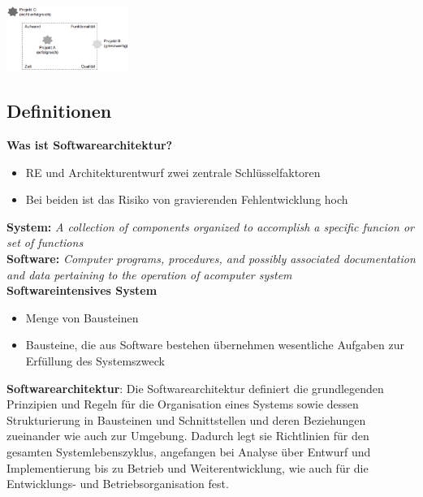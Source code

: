 \documentclass{report}
\newenvironment{Figure}
	{\par\medskip\noindent\minipage{\linewidth}}
	{\endminipage\par\medskip}
\theoremstyle{definition}
\theoremstyle{example}
\begin{document}
\begin{Figure}
   \centering
    \includegraphics[width=150px]{img/chaosReport.png}
        \label{fig:Abbildung des magischen Dreiecks zwischen Aufwand, Zeit, Funktionen, Qualitaet}
\end{Figure}


\subsection{Definitionen}
\textbf{Was ist Softwarearchitektur?}
\begin{itemize}
   \item RE und Architekturentwurf zwei zentrale Schlüsselfaktoren
   \item Bei beiden ist das Risiko von gravierenden Fehlentwicklung hoch
\end{itemize}

\textbf{System:} \textit{A collection of components organized to accomplish a specific funcion or set of functions}\\
\textbf{Software:} \textit{Computer programs, procedures, and possibly associated documentation and data pertaining to the operation of acomputer system}\\
\textbf{Softwareintensives System}
\begin{itemize}
   \item Menge von Bausteinen
   \item Bausteine, die aus Software bestehen übernehmen wesentliche Aufgaben zur Erfüllung des Systemszweck
\end{itemize}

\textbf{Softwarearchitektur}: Die Softwarearchitektur definiert die grundlegenden Prinzipien und
Regeln für die Organisation eines Systems sowie dessen
Strukturierung in Bausteinen und Schnittstellen und deren
Beziehungen zueinander wie auch zur Umgebung. Dadurch legt sie
Richtlinien für den gesamten Systemlebenszyklus, angefangen bei
Analyse über Entwurf und Implementierung bis zu Betrieb und
Weiterentwicklung, wie auch für die Entwicklungs- und
Betriebsorganisation fest.\\
\end{document}
